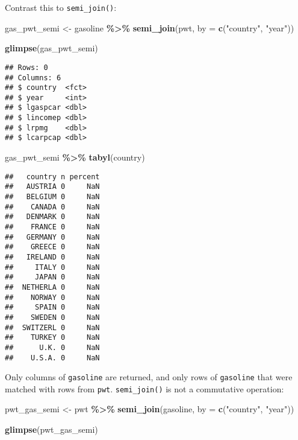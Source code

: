 \documentclass[
]{article}
\newenvironment{Shaded}{\begin{snugshade}}{\end{snugshade}}
\newcommand{\DataTypeTok}[1]{\textcolor[rgb]{0.13,0.29,0.53}{#1}}
\newcommand{\KeywordTok}[1]{\textcolor[rgb]{0.13,0.29,0.53}{\textbf{#1}}}
\newcommand{\NormalTok}[1]{#1}
\newcommand{\OperatorTok}[1]{\textcolor[rgb]{0.81,0.36,0.00}{\textbf{#1}}}
\newcommand{\StringTok}[1]{\textcolor[rgb]{0.31,0.60,0.02}{#1}}
\begin{document}
Contrast this to \texttt{semi\_join()}:

\begin{Shaded}
\begin{Highlighting}[]
\NormalTok{gas\_pwt\_semi \textless{}{-}}\StringTok{ }\NormalTok{gasoline }\OperatorTok{\%\textgreater{}\%}
\StringTok{  }\KeywordTok{semi\_join}\NormalTok{(pwt, }\DataTypeTok{by =} \KeywordTok{c}\NormalTok{(}\StringTok{"country"}\NormalTok{, }\StringTok{"year"}\NormalTok{))}

\KeywordTok{glimpse}\NormalTok{(gas\_pwt\_semi)}
\end{Highlighting}
\end{Shaded}

\begin{verbatim}
## Rows: 0
## Columns: 6
## $ country  <fct> 
## $ year     <int> 
## $ lgaspcar <dbl> 
## $ lincomep <dbl> 
## $ lrpmg    <dbl> 
## $ lcarpcap <dbl>
\end{verbatim}

\begin{Shaded}
\begin{Highlighting}[]
\NormalTok{gas\_pwt\_semi }\OperatorTok{\%\textgreater{}\%}
\StringTok{  }\KeywordTok{tabyl}\NormalTok{(country)}
\end{Highlighting}
\end{Shaded}

\begin{verbatim}
##   country n percent
##   AUSTRIA 0     NaN
##   BELGIUM 0     NaN
##    CANADA 0     NaN
##   DENMARK 0     NaN
##    FRANCE 0     NaN
##   GERMANY 0     NaN
##    GREECE 0     NaN
##   IRELAND 0     NaN
##     ITALY 0     NaN
##     JAPAN 0     NaN
##  NETHERLA 0     NaN
##    NORWAY 0     NaN
##     SPAIN 0     NaN
##    SWEDEN 0     NaN
##  SWITZERL 0     NaN
##    TURKEY 0     NaN
##      U.K. 0     NaN
##    U.S.A. 0     NaN
\end{verbatim}

Only columns of \texttt{gasoline} are returned, and only rows of \texttt{gasoline} that were matched with rows
from \texttt{pwt}. \texttt{semi\_join()} is not a commutative operation:

\begin{Shaded}
\begin{Highlighting}[]
\NormalTok{pwt\_gas\_semi \textless{}{-}}\StringTok{ }\NormalTok{pwt }\OperatorTok{\%\textgreater{}\%}
\StringTok{  }\KeywordTok{semi\_join}\NormalTok{(gasoline, }\DataTypeTok{by =} \KeywordTok{c}\NormalTok{(}\StringTok{"country"}\NormalTok{, }\StringTok{"year"}\NormalTok{))}

\KeywordTok{glimpse}\NormalTok{(pwt\_gas\_semi)}
\end{Highlighting}
\end{Shaded}
\end{document}

